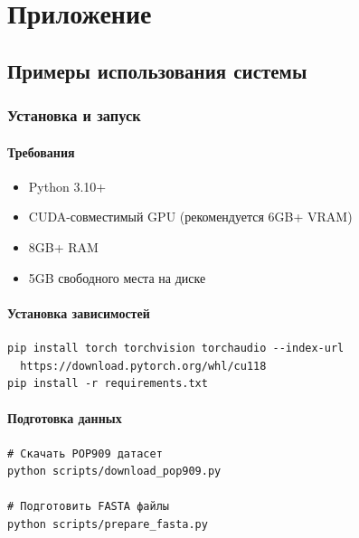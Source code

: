 \appendix

\chapter*{Приложение}
\setcounter{section}{0}
\setcounter{subsection}{0}
\setcounter{subsubsection}{0}
\setcounter{table}{0}
\renewcommand{\thesection}{\Alph{section}}
\renewcommand{\thesubsection}{\thesection.\arabic{subsection}}
\renewcommand{\thesubsubsection}{\thesubsection.\arabic{subsubsection}}
\renewcommand{\thetable}{\thesection.\arabic{table}}

\section{Примеры использования системы}

\subsection{Установка и запуск}

\subsubsection{Требования}

\begin{itemize}
\item Python 3.10+
\item CUDA-совместимый GPU (рекомендуется 6GB+ VRAM)
\item 8GB+ RAM
\item 5GB свободного места на диске
\end{itemize}

\subsubsection{Установка зависимостей}

\begin{verbatim}
pip install torch torchvision torchaudio --index-url
  https://download.pytorch.org/whl/cu118
pip install -r requirements.txt
\end{verbatim}

\subsubsection{Подготовка данных}

\begin{verbatim}
# Скачать POP909 датасет
python scripts/download_pop909.py

# Подготовить FASTA файлы
python scripts/prepare_fasta.py
\end{verbatim}

